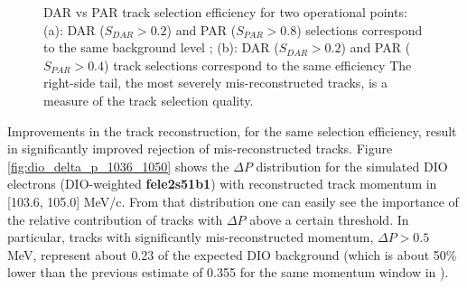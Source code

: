\begin{figure}
\hspace{-0.6in}
\caption{
  \label{fig:mumem_dar_vs_par_ann}
  DAR vs PAR track selection efficiency for two operational points: 
  (a): DAR ($S_{DAR} > 0.2$) and PAR ($S_{PAR} > 0.8$) selections correspond to the same background level ;  
  (b): DAR ($S_{DAR} > 0.2$) and PAR ($S_{PAR} > 0.4$) track selections correspond to the same efficiency
  The right-side tail, the most severely mis-reconstructed tracks, is a measure of the track selection
  quality.
}
\end{figure}

Improvements in the track reconstruction, for the same selection efficiency, result in significantly improved
rejection of mis-reconstructed tracks. Figure \ref{fig:dio_delta_p_1036_1050} shows the $\Delta{P}$ distribution
for the simulated DIO electrons (DIO-weighted {\bf fele2s51b1}) with reconstructed track momentum in [103.6, 105.0] MeV/c.
From that distribution one can easily see the importance of the relative contribution
of tracks with $\Delta{P}$ above a certain threshold. In particular, tracks with significantly mis-reconstructed
momentum, $\Delta{P} > 0.5$ MeV, represent about 0.23 of the expected DIO background (which is about 50\% lower
than the previous estimate of 0.355 for the same momentum window in \cite{MU2E_4595_ANN_TRAINING}).

